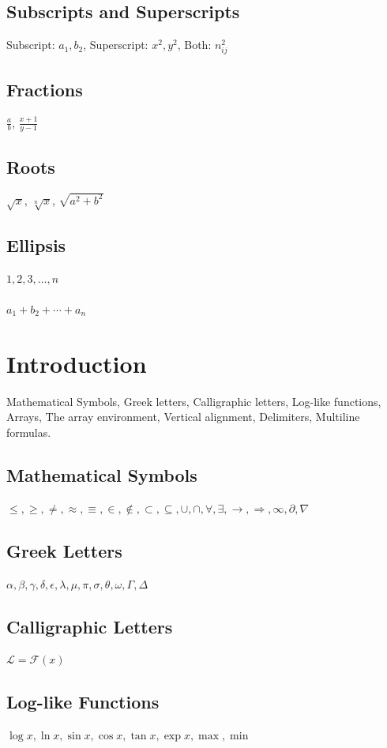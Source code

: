 \documentclass{article}
\begin{document}
\subsection{Subscripts and Superscripts}
Subscript: $a_1, b_2$,
Superscript: $x^2,y^2$,
Both: $n_{ij}^2$

\subsection{Fractions}
$\frac{a}{b}$,
$\frac{x+1}{y-1}$

\subsection{Roots}
$\sqrt{x}$,
$\sqrt[n]{x}$,
$\sqrt{a^2+b^2}$

\subsection{Ellipsis}
$1,2,3,\ldots,n$
\\ \\
$a_1+b_2+\cdots+a_n$
\section{Introduction}
Mathematical Symbols, Greek letters, Calligraphic letters, Log-like functions, Arrays, The array environment, Vertical alignment, Delimiters, Multiline formulas. 

\subsection{Mathematical Symbols}
$\leq, \geq,\neq, \approx, \equiv, \in, \notin, \subset, \subseteq, \cup, \cap, \forall, \exists, \rightarrow, \Rightarrow, \infty, \partial, \nabla$

\subsection{Greek Letters}
$\alpha, \beta, \gamma, \delta, \epsilon,\lambda, \mu, \pi, \sigma, \theta, \omega, \Gamma, \Delta$

\subsection{Calligraphic Letters}
$\mathcal{L} = \mathcal{F}(x)$

\subsection{Log-like Functions}
$\log x,\ln x,\sin x,\cos x,\tan x,\exp x,\max, \min$
\end{document}

